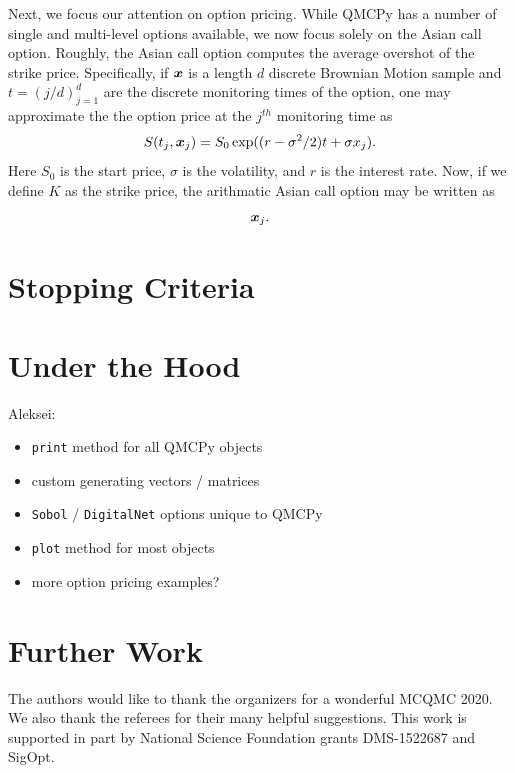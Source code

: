 \documentclass[graybox,footinfo]{svmult}
\newcommand{\AGSComment}[1]{{\color{cyan} Aleksei: #1}}
\begin{document}
Next, we focus our attention on option pricing. While QMCPy has a number of single and multi-level options available, we now focus solely on the Asian call option. Roughly, the  Asian call option computes the average overshot of the strike price. Specifically, if ${\boldsymbol{x}}$ is a length $d$ discrete Brownian Motion sample and $t = (j/d)_{j=1}^d$ are the discrete monitoring times of the option, one may approximate the the option price at the $j^{th}$ monitoring time as 
$$S(t_j,{\boldsymbol{x}}_j) = S_0 \exp((r-\sigma^2/2)t+\sigma x_j).$$
Here $S_0$ is the start price, $\sigma$ is the volatility, and $r$ is the interest rate. Now, if we define $K$ as the strike price, the arithmatic Asian call option may be written as 
$${\boldsymbol{x}}_j.$$

\section{Stopping Criteria}

%



\section{Under the Hood}

\AGSComment{
\begin{itemize}
    \item \texttt{print} method for all QMCPy objects
    \item custom generating vectors / matrices
    \item \texttt{Sobol} / \texttt{DigitalNet} options unique to QMCPy
    \item \texttt{plot} method for most objects
    \item more option pricing examples? 
\end{itemize}}

\section{Further Work} \label{sec:further}


\begin{acknowledgement}
The authors would like to thank the organizers for a wonderful MCQMC 2020. 
We also thank the referees for their many helpful suggestions.  This work is supported in part by National Science Foundation grants DMS-1522687 and SigOpt.


\end{acknowledgement}



\end{document}
